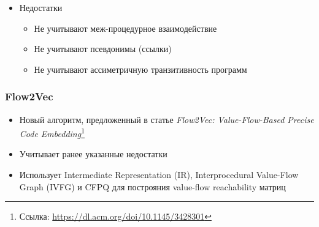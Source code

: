 \documentclass[xcolor=table,english]{beamer}
\begin{document}
\begin{frame}[fragile]
\begin{minipage}[m]{\linewidth}
\begin{itemize}
{\begin{itemize}
            \end{itemize}
            }
            \item Недостатки
            {
            \begin{itemize}
                \item Не учитывают меж-процедурное взаимодействие
                \item Не учитывают псевдонимы (ссылки)
                \item Не учитывают ассиметричную транзитивность программ
            \end{itemize}
            }
        \end{itemize}
    \end{minipage}
\end{frame}

\begin{frame}[fragile] \frametitle{Flow2Vec}
    \begin{itemize}
            \item Новый алгоритм, предложенный в статье \textit{Flow2Vec: Value-Flow-Based Precise Code Embedding}\footnote{Ссылка: \href{https://dl.acm.org/doi/10.1145/3428301}{https://dl.acm.org/doi/10.1145/3428301}} 
            \item Учитывает ранее указанные недостатки
            \item Использует Intermediate Representation (IR), Interprocedural Value-Flow Graph (IVFG) и  CFPQ для построяния value-flow reachability матриц
        \end{itemize}
\end{frame}
\end{document}
